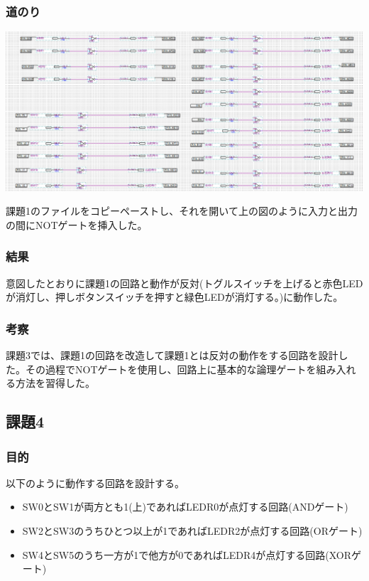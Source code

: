 \documentclass[a4paper]{jarticle}
\begin{document}
\subsubsection{道のり}
\begin{center}
	\includegraphics[width=15cm]{work3.PNG}
\end{center}
課題1のファイルをコピーペーストし、それを開いて上の図のように入力と出力の間にNOTゲートを挿入した。
\subsubsection{結果}
意図したとおりに課題1の回路と動作が反対(トグルスイッチを上げると赤色LEDが消灯し、押しボタンスイッチを押すと緑色LEDが消灯する。)に動作した。
\subsubsection{考察}
課題3では、課題1の回路を改造して課題1とは反対の動作をする回路を設計した。その過程でNOTゲートを使用し、回路上に基本的な論理ゲートを組み入れる方法を習得した。
\subsection{課題4}
\subsubsection{目的}
以下のように動作する回路を設計する。
\begin{itemize}
	\item SW0とSW1が両方とも1(上)であればLEDR0が点灯する回路(ANDゲート)
	\item SW2とSW3のうちひとつ以上が1であればLEDR2が点灯する回路(ORゲート)
	\item SW4とSW5のうち一方が1で他方が0であればLEDR4が点灯する回路(XORゲート)
\end{itemize}
\end{document}
